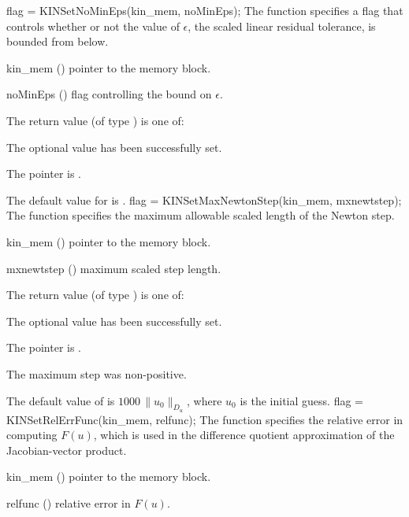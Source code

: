 {
flag = KINSetNoMinEps(kin\_mem, noMinEps);
}
{
  The function  specifies a flag that controls whether or not
  the value of $\epsilon$, the scaled linear residual tolerance, is
  bounded from below.
}
{
  \begin{args}[noMinEps]
  \item[kin\_mem] ()
    pointer to the {\kinsol} memory block.
  \item[noMinEps] ()
    flag controlling the bound on $\epsilon$.
  \end{args}
}
{
  The return value  (of type ) is one of:
  \begin{args}
  \item[\Id{KIN\_SUCCESS}] 
    The optional value has been successfully set.
  \item[\Id{KIN\_MEM\_NULL}]
    The  pointer is .
  \end{args}
}
{
  The default value for  is .
}
{
flag = KINSetMaxNewtonStep(kin\_mem, mxnewtstep);
}
{
  The function  specifies the maximum allowable scaled
  length of the Newton step.
}
{
  \begin{args}[mxnewtstep]
  \item[kin\_mem] ()
    pointer to the {\kinsol} memory block.
  \item[mxnewtstep] ()
    maximum scaled step length.
  \end{args}
}
{
  The return value  (of type ) is one of:
  \begin{args}
  \item[\Id{KIN\_SUCCESS}] 
    The optional value has been successfully set.
  \item[\Id{KIN\_MEM\_NULL}]
    The  pointer is .
  \item[\Id{KIN\_ILL\_INPUT}]
    The maximum step was non-positive.
  \end{args}
}
{
  The default value of  is $1000\, \| u_0 \|_{D_u}$,
  where $u_0$ is the initial guess.
}
{
flag = KINSetRelErrFunc(kin\_mem, relfunc);
}
{
  The function  specifies the relative error in 
  computing $F(u)$, which is used in the difference quotient approximation of the
  Jacobian-vector product.
}
{
  \begin{args}[relfunc]
  \item[kin\_mem] ()
    pointer to the {\kinsol} memory block.
  \item[relfunc] ()
    relative error in $F(u)$.
  \end{args}
}
